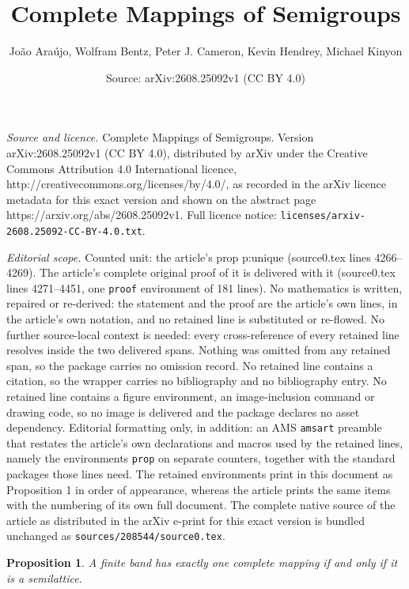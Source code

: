\documentclass[10pt,a4paper]{amsart}
\title{Complete Mappings of Semigroups}
\author{Jo\~ao Ara\'ujo, Wolfram Bentz, Peter J. Cameron, Kevin Hendrey, Michael Kinyon}
\date{Source: arXiv:2608.25092v1 (CC BY 4.0)}
\newtheorem{prop}{Proposition}
\begin{document}
\maketitle

\noindent\emph{Source and licence.} Complete Mappings of Semigroups. Version arXiv:2608.25092v1 (CC BY 4.0), distributed by arXiv under the Creative Commons Attribution 4.0 International licence, http://creativecommons.org/licenses/by/4.0/, as recorded in the arXiv licence metadata for this exact version and shown on the abstract page https://arxiv.org/abs/2608.25092v1. Full licence notice: \texttt{licenses/arxiv-2608.25092-CC-BY-4.0.txt}.\par\smallskip

\noindent\textit{Editorial scope.} Counted unit: the article's prop p:unique (source0.tex lines 4266--4269). The article's complete original proof of it is delivered with it (source0.tex lines 4271--4451, one \texttt{proof} environment of 181 lines). No mathematics is written, repaired or re-derived: the statement and the proof are the article's own lines, in the article's own notation, and no retained line is substituted or re-flowed.  No further source-local context is needed: every cross-reference of every retained line resolves inside the two delivered spans.  Nothing was omitted from any retained span, so the package carries no omission record.  No retained line contains a citation, so the wrapper carries no bibliography and no bibliography entry.  No retained line contains a figure environment, an image-inclusion command or drawing code, so no image is delivered and the package declares no asset dependency.  Editorial formatting only, in addition: an AMS \texttt{amsart} preamble that restates the article's own declarations and macros used by the retained lines, namely the environments \texttt{prop} on separate counters, together with the standard packages those lines need.  The retained environments print in this document as Proposition 1 in order of appearance, whereas the article prints the same items with the numbering of its own full document.  The complete native source of the article as distributed in the arXiv e-print for this exact version is bundled unchanged as \texttt{sources/208544/source0.tex}.
\begin{prop}\label{p:unique}
    A finite band has exactly one complete mapping if and only if it is a
    semilattice.
\end{prop}
\end{document}
